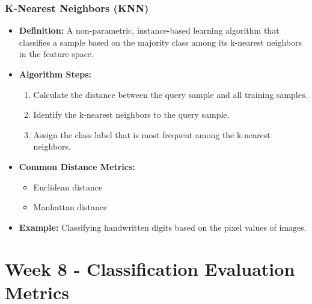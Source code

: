 \documentclass[8pt]{article}
\begin{document}
\subsubsection{K-Nearest Neighbors (KNN)}
\begin{itemize}
    \item \textbf{Definition:} A non-parametric, instance-based learning algorithm that classifies a sample based on the majority class among its k-nearest neighbors in the feature space.
    \item \textbf{Algorithm Steps:}
    \begin{enumerate}
        \item Calculate the distance between the query sample and all training samples.
        \item Identify the k-nearest neighbors to the query sample.
        \item Assign the class label that is most frequent among the k-nearest neighbors.
    \end{enumerate}
    \item \textbf{Common Distance Metrics:}
    \begin{itemize}
        \item Euclidean distance
        \item Manhattan distance
    \end{itemize}
    \item \textbf{Example:} Classifying handwritten digits based on the pixel values of images.
\end{itemize}

\newpage
\section{Week 8 - Classification Evaluation Metrics}
\end{document}
